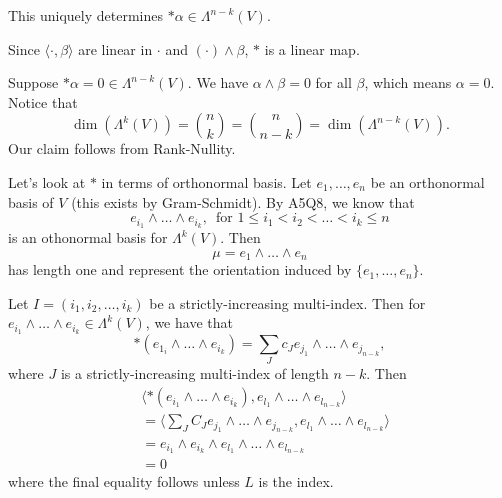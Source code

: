 \documentclass[notoc,notitlepage]{tufte-book}
\begin{document}
\begin{note}
  This uniquely determines $*\alpha \in \Lambda^{n-k}(V)$.

  Since $\langle \cdot, \beta \rangle$ are linear in $\cdot$ and $(\cdot) \land
  \beta$, $*$ is a linear map.

  \noindent
   Suppose $* \alpha = 0 \in
  \Lambda^{n-k}(V)$. We have  $\alpha \land \beta = 0$ for all $\beta$, which
  means $\alpha = 0$. Notice that
   \begin{equation*}
     \dim (\Lambda^k(V)) = \binom{n}{k} = \binom{n}{n-k} =
     \dim(\Lambda^{n-k}(V)).
  \end{equation*}
  Our claim follows from Rank-Nullity.
\end{note}

Let's look at $*$ in terms of orthonormal basis. Let $e_1, \ldots, e_n$ be an
orthonormal basis of $V$ (this exists by Gram-Schmidt). By A5Q8, we know that
\begin{equation*}
  e_{i_1} \land \hdots \land e_{i_k}, \, \text{ for } 1 \leq i_1 < i_2 < \hdots
  < i_k \leq n
\end{equation*}
is an othonormal basis for $\Lambda^k(V)$. Then
\begin{equation*}
  \mu = e_1 \land \hdots \land e_n
\end{equation*}
has length one and represent the orientation induced by $\{ e_1, \ldots, e_n\}$.

Let $I = (i_1, i_2, \ldots, i_k)$ be a strictly-increasing multi-index. Then for
$e_{i_1} \land \hdots \land e_{i_k} \in \Lambda^k(V)$, we have that
\begin{equation*}
  *(e_{1_i} \land \hdots \land e_{i_k}) = \sum_{J} c_J e_{j_1} \land \hdots
  \land e_{j_{n-k}},
\end{equation*}
where $J$ is a strictly-increasing multi-index of length $n - k$.
Then
\begin{align*}
  &\langle *(e_{i_1} \land \hdots \land e_{i_k}), e_{l_1} \land \hdots \land
  e_{l_{n-k}} \rangle  \\
  &= \langle \sum_{J} C_J e_{j_1} \land \hdots \land e_{j_{n-k}}, e_{l_1} \land
  \hdots \land e_{l_{n-k}} \rangle \\
  &= e_{i_1} \land e_{i_k} \land e_{l_1} \land \hdots \land e_{l_{n-k}} \\
  &= 0
\end{align*}
where the final equality follows unless $L$ is the 
index.
\end{document}
